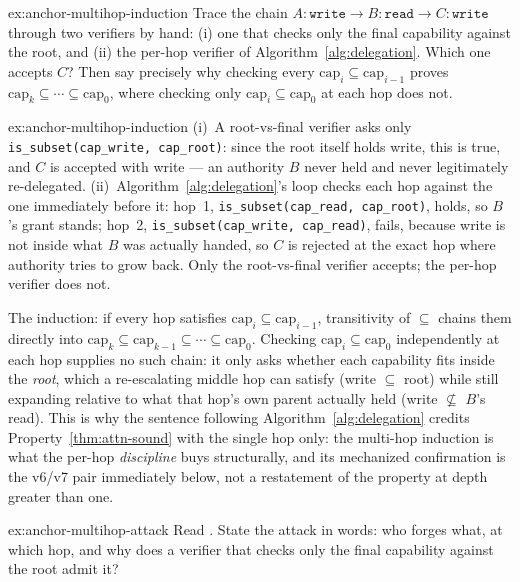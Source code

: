 \documentclass[11pt,a4paper]{article}
\theoremstyle{definition}
\begin{document}

\begin{pdexercise}[kind=Trace,rating=2]{ex:anchor-multihop-induction}
Trace the chain $A{:}\texttt{write} \to B{:}\texttt{read} \to C{:}\texttt{write}$ through two verifiers by hand: (i) one that checks only the final capability against the root, and (ii) the per-hop verifier of Algorithm~\ref{alg:delegation}. Which one accepts $C$? Then say precisely why checking every $\mathrm{cap}_i \subseteq \mathrm{cap}_{i-1}$ proves $\mathrm{cap}_k \subseteq \cdots \subseteq \mathrm{cap}_0$, where checking only $\mathrm{cap}_i \subseteq \mathrm{cap}_0$ at each hop does not.
\end{pdexercise}
\begin{pdsolution}{ex:anchor-multihop-induction}
(i)~A root-vs-final verifier asks only \texttt{is\_subset(cap\_write, cap\_root)}: since the root itself holds write, this is true, and $C$ is accepted with write --- an authority $B$ never held and never legitimately re-delegated. (ii)~Algorithm~\ref{alg:delegation}'s loop checks each hop against the one immediately before it: hop~1, \texttt{is\_subset(cap\_read, cap\_root)}, holds, so $B$'s grant stands; hop~2, \texttt{is\_subset(cap\_write, cap\_read)}, fails, because write is not inside what $B$ was actually handed, so $C$ is rejected at the exact hop where authority tries to grow back. Only the root-vs-final verifier accepts; the per-hop verifier does not.

The induction: if every hop satisfies $\mathrm{cap}_i \subseteq \mathrm{cap}_{i-1}$, transitivity of $\subseteq$ chains them directly into $\mathrm{cap}_k \subseteq \mathrm{cap}_{k-1} \subseteq \cdots \subseteq \mathrm{cap}_0$. Checking $\mathrm{cap}_i \subseteq \mathrm{cap}_0$ independently at each hop supplies no such chain: it only asks whether each capability fits inside the \emph{root}, which a re-escalating middle hop can satisfy (write $\subseteq$ root) while still expanding relative to what that hop's own parent actually held (write $\not\subseteq$ $B$'s read). This is why the sentence following Algorithm~\ref{alg:delegation} credits Property~\ref{thm:attn-sound} with the single hop only: the multi-hop induction is what the per-hop \emph{discipline} buys structurally, and its mechanized confirmation is the v6/v7 pair immediately below, not a restatement of the property at depth greater than one.
\end{pdsolution}
\begin{pdexercise}[kind=Trace,rating=2]{ex:anchor-multihop-attack}
Read . State the attack in words: who forges what, at which hop, and why does a verifier that checks only the final capability against the root admit it?
\end{pdexercise}
\end{document}
